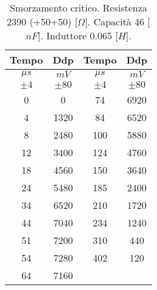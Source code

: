 \begin{table}[H]
\begin{center}
\begin{tabular}{|c|c|c|c|}
\hline
Tempo & Ddp & Tempo & Ddp \\ \hline
$\mu s$ & $mV$ & $\mu s$ & $mV$ \\ \hline
$\pm 4$ & $\pm 80$ & $\pm 4$ & $\pm 80$ \\ \hline
0 & 0 & 74 & 6920 \\ \hline
4 & 1320 & 84 & 6520 \\ \hline
8 & 2480 & 100 & 5880 \\ \hline
12 & 3400 & 124 & 4760 \\ \hline
18 & 4560 & 150 & 3640 \\ \hline
24 & 5480 & 185 & 2400 \\ \hline
34 & 6520 & 210 & 1720 \\ \hline
44 & 7040 & 234 & 1240 \\ \hline
51 & 7200 & 310 & 440 \\ \hline
54 & 7280 & 402 & 120 \\ \hline
64 & 7160 & \multicolumn{1}{l|}{} & \multicolumn{1}{l|}{} \\ \hline
\end{tabular}
\end{center}
\caption{Smorzamento critico.
Resistenza 2390 (+50+50)   [$\Omega$].
Capacità  46    [$nF$].
Induttore 0.065 [$H$].
}
\label{tab:C4_P1_critico}
\end{table}